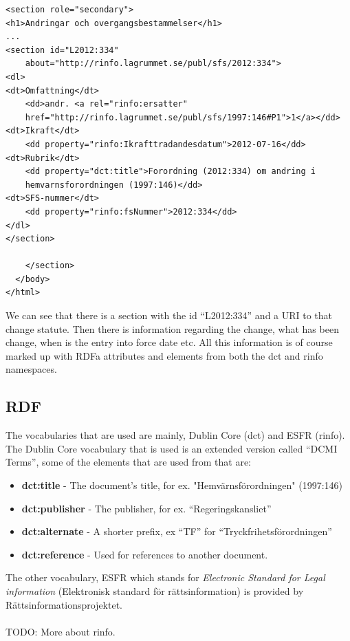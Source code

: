 \begin{verbatim}
<section role="secondary">
<h1>Andringar och overgangsbestammelser</h1>
...
<section id="L2012:334" 
    about="http://rinfo.lagrummet.se/publ/sfs/2012:334">
<dl>
<dt>Omfattning</dt>
    <dd>andr. <a rel="rinfo:ersatter"
    href="http://rinfo.lagrummet.se/publ/sfs/1997:146#P1">1</a></dd>
<dt>Ikraft</dt>
    <dd property="rinfo:Ikrafttradandesdatum">2012-07-16</dd>
<dt>Rubrik</dt>
    <dd property="dct:title">Forordning (2012:334) om andring i 
    hemvarnsforordningen (1997:146)</dd>
<dt>SFS-nummer</dt>
    <dd property="rinfo:fsNummer">2012:334</dd>
</dl>
</section>

    </section>
  </body>
</html>
\end{verbatim}
\linebreak
\newline
We can see that there is a section with the id “L2012:334” and a URI to that change statute. Then there is information regarding the change, what has been change, when is the entry into force date etc. All this information is of course marked up with RDFa attributes and elements from both the dct and rinfo namespaces. 
 
\subsection{RDF}
The vocabularies that are used are mainly, Dublin Core (dct) and ESFR (rinfo). The Dublin Core vocabulary that is used is an extended version called “DCMI Terms”, some of the elements that are used from that are:\\ 
\begin{itemize}
\item \textbf{dct:title} - The document's title, for ex. "Hemvärnsförordningen" (1997:146)
\item \textbf{dct:publisher} - The publisher, for ex. “Regeringskansliet”
\item \textbf{dct:alternate} - A shorter prefix, ex “TF” for “Tryckfrihetsförordningen”
\item \textbf{dct:reference} - Used for references to another document. 
\end{itemize}
The other vocabulary, ESFR which stands for \textit{Electronic Standard for Legal information} (Elektronisk standard för rättsinformation) is provided by Rättsinformationsprojektet.\\\\
TODO: More about rinfo.


